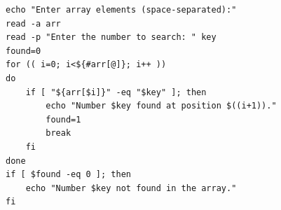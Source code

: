 \begin{verbatim}
echo "Enter array elements (space-separated):"
read -a arr
read -p "Enter the number to search: " key
found=0
for (( i=0; i<${#arr[@]}; i++ ))
do
    if [ "${arr[$i]}" -eq "$key" ]; then
        echo "Number $key found at position $((i+1))."
        found=1
        break
    fi
done
if [ $found -eq 0 ]; then
    echo "Number $key not found in the array."
fi
\end{verbatim}